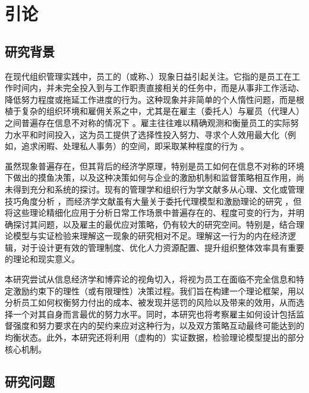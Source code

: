 \chapter{引论}

\section{研究背景}

在现代组织管理实践中，员工的（或称、）现象日益引起关注。它指的是员工在工作时间内，并未完全投入到与工作职责直接相关的任务中，而是从事非工作活动、降低努力程度或拖延工作进度的行为。这种现象并非简单的个人惰性问题，而是根植于复杂的组织环境和雇佣关系之中，尤其是在雇主（委托人）与雇员（代理人）之间普遍存在{信息不对称}的情况下 \citep{akerlof1970market, spence1973job}。雇主往往难以精确观测和衡量员工的实际努力水平和时间投入，这为员工提供了选择性投入努力、寻求个人效用最大化（例如，追求闲暇、处理私人事务）的空间，即采取某种程度的行为 \citep{alchian1972production}。

虽然现象普遍存在，但其背后的经济学原理，特别是员工如何在信息不对称的环境下做出的摸鱼决策，以及这种决策如何与企业的激励机制和监督策略相互作用，尚未得到充分和系统的探讨。现有的管理学和组织行为学文献多从心理、文化或管理技巧角度分析 \citep[例如][]{ashforth1990social, robbins2016organizational}，而经济学文献虽有大量关于委托代理模型和激励理论的研究 \citep{holmstrom1979moral, grossman1983analysis}，但将这些理论精细化应用于分析日常工作场景中普遍存在的、程度可变的行为，并明确探讨其问题，以及雇主的最优应对策略，仍有较大的研究空间。特别是，结合理论模型与实证检验来理解这一现象的研究相对不足。理解这一行为的内在经济逻辑，对于设计更有效的管理制度、优化人力资源配置、提升组织整体效率具有重要的理论和现实意义。

本研究尝试从{信息经济学}和{博弈论}的视角切入，将视为员工在面临不完全信息和特定激励约束下的理性（或有限理性）决策过程。我们旨在构建一个理论框架，用以分析员工如何权衡努力付出的成本、被发现并惩罚的风险以及带来的效用，从而选择一个对其自身而言最优的努力水平。同时，本研究也将考察雇主如何设计包括{监督}强度和努力要求在内的契约来应对这种行为，以及双方策略互动最终可能达到的均衡状态。此外，本研究还将利用（虚构的）实证数据，检验理论模型提出的部分核心机制。

\section{研究问题}

